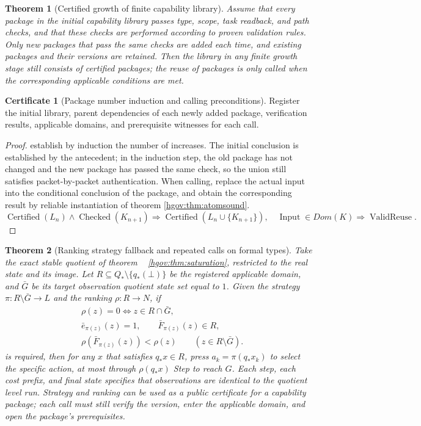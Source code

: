 \documentclass[12pt,a4paper,openany,notitlepage]{report}
\theoremstyle{plain}
\newtheorem{theorem}{Theorem}[chapter]
\theoremstyle{definition}
\newtheorem*{certificate}{Certificate}
\theoremstyle{remark}
\def\mathcal#1{#1}\def\mathsf#1{#1}\def\mathbb#1{#1}%
\begin{document}
\begin{CJK*}
\begin{theorem}
[Certified growth of finite capability library]\label{hgov:thm:library}
Assume that every package in the initial capability library passes type, scope, task readback, and path checks, and that these checks are performed according to proven validation rules. Only new packages that pass the same checks are added each time, and existing packages and their versions are retained. Then the library in any finite growth stage still consists of certified packages; the reuse of packages is only called when the corresponding applicable conditions are met.\end{theorem}
\begin{certificate}
[Package number induction and calling preconditions]Register the initial library, parent dependencies of each newly added package, verification results, applicable domains, and prerequisite witnesses for each call.\end{certificate}
\begin{proof}
establish by induction the number of increases. The initial conclusion is established by the antecedent; in the induction step, the old package has not changed and the new package has passed the same check, so the union still satisfies packet-by-packet authentication. When calling, replace the actual input into the conditional conclusion of the package, and obtain the corresponding result by reliable instantiation of theorem \ref{hgov:thm:atomsound}. \[
\operatorname{Certified}(\mathcal L_n)\land\operatorname{Checked}(K_{n+1})
\Rightarrow\operatorname{Certified}(\mathcal L_n\cup\{K_{n+1}\}),
\quad
\operatorname{Input}\in\mathsf{Dom}(K)\Rightarrow\operatorname{ValidReuse}.
\]\end{proof}


\begin{theorem}
[Ranking strategy fallback and repeated calls on formal types]\label{exp:gov:policy-reuse}
Take the exact stable quotient of theorem ~ \ref{hgov:thm:saturation}, restricted to the real state and its image. Let $R\subseteq Q_*\setminus\{q_*(\bot)\}$ be the registered applicable domain, and $\bar G$ be its target observation quotient state set equal to $1$. Given the strategy $\pi:R\setminus\bar G\to L$ and the ranking $\rho:R\to\mathbb N$, if \[
\begin{aligned}
 &\rho(z)=0\Longleftrightarrow z\in R\cap\bar G,\\
 &\bar e_{\pi(z)}(z)=1,
 \qquad \bar F_{\pi(z)}(z)\in R,\\
 &\rho(\bar F_{\pi(z)}(z))<\rho(z)
 \qquad(z\in R\setminus\bar G).
\end{aligned}
\] is required, then for any $x$ that satisfies $q_*x\in R$, press $a_k=\pi(q_*x_k)$ to select the specific action, at most through $\rho(q_*x)$ Step to reach $G$. Each step, each cost prefix, and final state specifies that observations are identical to the quotient level run. Strategy and ranking can be used as a public certificate for a capability package; each call must still verify the version, enter the applicable domain, and open the package's prerequisites.


\end{theorem}
\end{CJK*}
\end{document}

